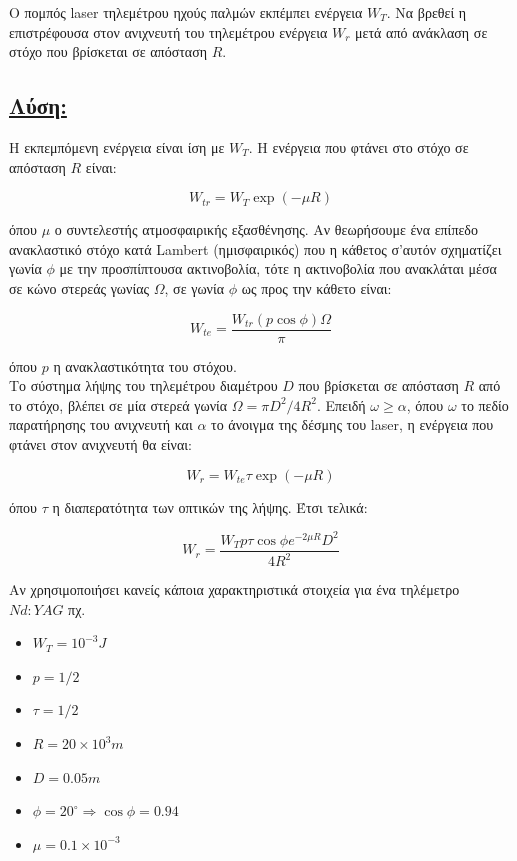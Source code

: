 \documentclass[a4paper,11pt,titlepage]{article}
\newcommand{\degrees}{^{\circ}}
\numberwithin{equation}{section} %
\begin{document}
Ο πομπός laser τηλεμέτρου ηχούς παλμών εκπέμπει ενέργεια $W_T$. Να βρεθεί η επιστρέφουσα στον ανιχνευτή του τηλεμέτρου ενέργεια $W_r$ μετά από ανάκλαση σε στόχο που βρίσκεται σε απόσταση $R$.

\subsection*{\underline{Λύση:}}

Η εκπεμπόμενη ενέργεια είναι ίση με $W_T$.  Η ενέργεια που φτάνει στο στόχο σε απόσταση $R$ είναι:

\begin{equation}
 W_{tr}=W_T\exp(-\mu R)
\end{equation}

όπου $\mu$ ο συντελεστής ατμοσφαιρικής εξασθένησης. Αν θεωρήσουμε ένα επίπεδο ανακλαστικό στόχο κατά Lambert (ημισφαιρικός) που η κάθετος σ'αυτόν σχηματίζει γωνία $\phi$ με την προσπίπτουσα ακτινοβολία, τότε η ακτινοβολία που ανακλάται μέσα σε κώνο στερεάς γωνίας $\Omega$, σε γωνία $\phi$ ως προς την κάθετο είναι:

\begin{equation}
 W_{te}=\frac{W_{tr}(p \cos\phi)\Omega }{\pi}
\end{equation}

όπου $p$ η ανακλαστικότητα του στόχου. \\[0.3cm]
Το σύστημα λήψης του τηλεμέτρου διαμέτρου $D$ που βρίσκεται σε απόσταση $R$ από το στόχο, βλέπει σε μία στερεά γωνία $\Omega=\pi D^2/4R^2$. Επειδή $\omega\geq \alpha$, όπου $\omega$ το πεδίο παρατήρησης του ανιχνευτή και $\alpha$ το άνοιγμα της δέσμης του laser, η ενέργεια που φτάνει στον ανιχνευτή θα είναι:

\begin{equation}
 W_r=W_{te}\tau\exp(-\mu R)
\end{equation}

όπου $\tau$ η διαπερατότητα των οπτικών της λήψης. Έτσι τελικά:

\begin{equation}
 W_r=\dfrac{W_T p \tau\cos\phi e^{-2\mu R}D^2}{4R^2}
\end{equation}

Αν χρησιμοποιήσει κανείς κάποια χαρακτηριστικά στοιχεία για ένα τηλέμετρο $Nd:YAG$ πχ.
\begin{itemize}
 \item $W_T=10^{-3}J$
 \item $p=1/2$
 \item $\tau=1/2$
 \item $R=20\times10^3m$
 \item $D=0.05m$
 \item $\phi=20\degrees\Longrightarrow \cos\phi=0.94$
 \item $\mu=0.1\times10^{-3}$
\end{itemize}
\end{document}
